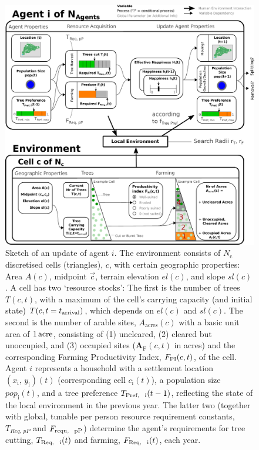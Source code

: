 \begin{figure}[H]
	\centering
	\includegraphics[width=1.\textwidth, center]{images/SketchABM2/sketch_triangles.pdf}
	\caption{
		Sketch of an update of agent $i$.
		The environment consists of $N_\text{c}$ discretised cells (triangles), $c$, with certain geographic properties: Area $A(c)$, midpoint $\vec{c}$, terrain elevation $el(c)$, and slope $sl(c)$.  %
		A cell has two `resource stocks':
		The first is the number of trees $T(c,t)$, with a maximum of the cell's carrying capacity (and initial state) $T(c,t=t_{\rm arrival})$, which depends on $el(c)$ and $sl(c)$. 
		The second is the number of arable sites, $A_\text{acres}(c)$ with a basic unit area of $1\, {\rm acre}$, consisting of (1) uncleared, (2) cleared but unoccupied, and (3) occupied sites ($\mathbf{A}_\text{F}(c,t)$ in acres) and the corresponding Farming Productivity Index, $F_{\rm PI}(c,t)$, of the cell.
		Agent $i$ represents a household with a settlement location $(x_\text{i},\, y_\text{i})(t)$ (corresponding cell $c_\text{i}(t)$), a population size $pop_\text{i}(t)$, and a tree preference $T_\text{Pref, \, i}(t-1)$, reflecting the state of the local environment in the previous year. The latter two (together with global, tunable per person resource requirement constants, $T_{Req, \, pP}$ and  $F_\text{requ, \, pP}$) determine the agent's requirements for tree cutting, $T_\text{Req, \, i}(t)$ and farming, $F_\text{Req, \, i}(t)$, each year.
}
\end{figure}
